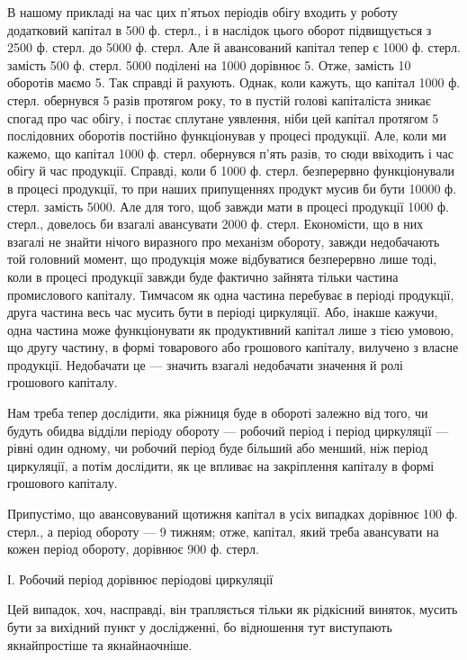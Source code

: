 В нашому прикладі на час цих п’ятьох періодів обігу входить у роботу
додатковий капітал в 500 ф. стерл., і в наслідок цього оборот підвищується
з 2500 ф. стерл. до 5000 ф. стерл. Але й авансований капітал
тепер є 1000 ф. стерл. замість 500 ф. стерл. 5000 поділені на 1000
дорівнює 5. Отже, замість 10 оборотів маємо 5. Так справді й рахують.
Однак, коли кажуть, що капітал 1000 ф. стерл. обернувся 5 разів протягом
року, то в пустій голові капіталіста зникає спогад про час обігу,
і постає сплутане уявлення, ніби цей капітал протягом 5 послідовних
оборотів постійно функціонував у процесі продукції. Але, коли ми кажемо,
що капітал 1000 ф. стерл. обернувся п’ять разів, то сюди ввіходить
і час обігу й час продукції. Справді, коли б 1000 ф. стерл. безперервно
функціонували в процесі продукції, то при наших припущеннях продукт
мусив би бути 10000 ф. стерл. замість 5000. Але для того, щоб завжди
мати в процесі продукції 1000 ф. стерл., довелось би взагалі авансувати
2000 ф. стерл. Економісти, що в них взагалі не знайти нічого виразного
про механізм обороту, завжди недобачають той головний момент, що
продукція може відбуватися безперервно лише тоді, коли в процесі продукції
завжди буде фактично зайнята тільки частина промислового капіталу.
Тимчасом як одна частина перебуває в періоді продукції, друга частина
весь час мусить бути в періоді циркуляції. Або, інакше кажучи, одна
частина може функціонувати як продуктивний капітал лише з тією умовою,
що другу частину, в формі товарового або грошового капіталу, вилучено
з власне продукції. Недобачати це — значить взагалі недобачати значення
й ролі грошового капіталу.

Нам треба тепер дослідити, яка ріжниця буде в обороті залежно від
того, чи будуть обидва відділи періоду обороту — робочий період і період
циркуляції — рівні один одному, чи робочий період буде більший
або менший, ніж період циркуляції, а потім дослідити, як це впливає на
закріплення капіталу в формі грошового капіталу.

Припустімо, що авансовуваний щотижня капітал в усіх випадках дорівнює
100 ф. стерл., а період обороту — 9 тижням; отже, капітал, який
треба авансувати на кожен період обороту, дорівнює 900 ф. стерл.

І. Робочий період дорівнює періодові циркуляції

Цей випадок, хоч, насправді, він трапляється тільки як рідкісний виняток,
мусить бути за вихідний пункт у дослідженні, бо відношення тут виступають
якнайпростіше та якнайнаочніше.

